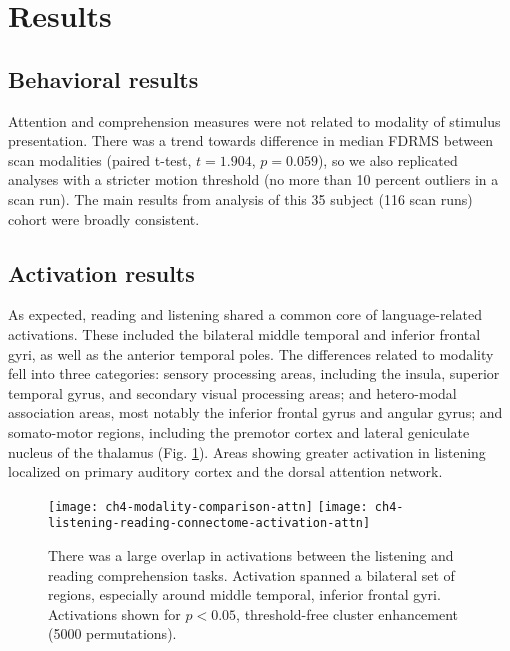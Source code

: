 \section{Results}

\subsection{Behavioral results}

Attention and comprehension measures were not related to modality of stimulus presentation. There was a trend towards difference in median FDRMS between scan modalities (paired t-test, $t = 1.904$, $p = 0.059$), so we also replicated analyses with a stricter motion threshold (no more than 10 percent outliers in a scan run). The main results from analysis of this 35 subject (116 scan runs) cohort were broadly consistent.

\subsection{Activation results}

As expected, reading and listening shared a common core of language-related activations. These included the bilateral middle temporal and inferior frontal gyri, as well as the  anterior temporal poles. The differences related to modality fell into three categories: sensory processing areas, including the insula, superior temporal gyrus, and secondary visual processing areas; and hetero-modal association areas, most notably the inferior frontal gyrus and angular gyrus; and somato-motor regions, including the premotor cortex and lateral geniculate nucleus of the thalamus (Fig. \ref{fig:ch4-modality-comparison-attn}). Areas showing greater activation in listening localized on primary auditory cortex and the dorsal attention network.

\begin{figure}[t!]
	\centering
	\texttt{[image: ch4-modality-comparison-attn]}
	\texttt{[image: ch4-listening-reading-connectome-activation-attn]}
    \caption[Large overlap between listening and reading activation.]{There was a large overlap in activations between the listening and reading comprehension tasks. Activation spanned a bilateral set of regions, especially around middle temporal, inferior frontal gyri. Activations shown for $p < 0.05$, threshold-free cluster enhancement (5000 permutations).}
	\label{fig:ch4-modality-comparison-attn}
\end{figure}

